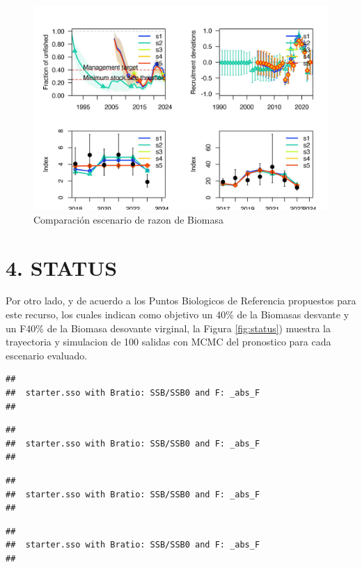 \documentclass[
]{article}
\begin{document}
\begin{figure}[H]

{\centering \includegraphics{Dtrunculus_SS3_2024_files/figure-latex/devrec-1} 

}

\caption{\label{fig:devrec}Comparación escenario de razon de Biomasa}\label{fig:devrec}
\end{figure}

\hypertarget{status}{%
\section{4. STATUS}\label{status}}

Por otro lado, y de acuerdo a los Puntos Biologicos de Referencia propuestos para este recurso, los cuales indican como objetivo un 40\% de la Biomasas desvante y un F40\% de la Biomasa desovante virginal, la Figura \ref{fig:status}) muestra la trayectoria y simulacion de 100 salidas con MCMC del pronostico para cada escenario evaluado.

\begin{verbatim}
## 
##  starter.sso with Bratio: SSB/SSB0 and F: _abs_F 
## 
\end{verbatim}

\begin{verbatim}
## 
##  starter.sso with Bratio: SSB/SSB0 and F: _abs_F 
## 
\end{verbatim}

\begin{verbatim}
## 
##  starter.sso with Bratio: SSB/SSB0 and F: _abs_F 
## 
\end{verbatim}

\begin{verbatim}
## 
##  starter.sso with Bratio: SSB/SSB0 and F: _abs_F 
## 
\end{verbatim}
\end{document}
